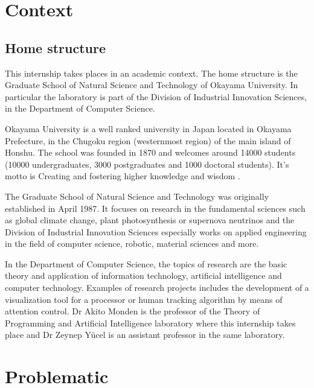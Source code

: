 \documentclass[12pt,a4paper,twoside]{article}
\begin{document}
\tableofcontents

\newpage

\section{Context}

\subsection{Home structure}
This internship takes places in an academic context. The home structure is the Graduate School of Natural Science and Technology of Okayama University. In particular the laboratory is part of the Division of Industrial Innovation Sciences, in the Department of Computer Science.

Okayama University is a well ranked university in Japan located in Okayama Prefecture, in the Chugoku region (westernmost region) of the main island of Honshu. The school was founded in 1870  and welcomes around 14000 students (10000 undergraduates, 3000 postgraduates and 1000 doctoral students). It's motto is \guillemotleft Creating and fostering higher knowledge and wisdom \guillemotright.

The Graduate School of Natural Science and Technology was originally established in April 1987. It focuses on research in the fundamental sciences such as global climate change, plant photosynthesis or supernova neutrinos and the Division of Industrial Innovation Sciences especially works on applied engineering in the field of computer science, robotic, material sciences and more. 

In the Department of Computer Science, the topics of research are the basic theory and application of information technology, artificial intelligence and computer technology. Examples of research projects includes the development of a visualization tool for a processor or human tracking  algorithm by means of attention control. Dr Akito Monden is the professor of the Theory of Programming and Artificial Intelligence laboratory where this internship takes place and Dr Zeynep Yücel is an assistant professor in the same laboratory.

\section{Problematic}
\end{document}
